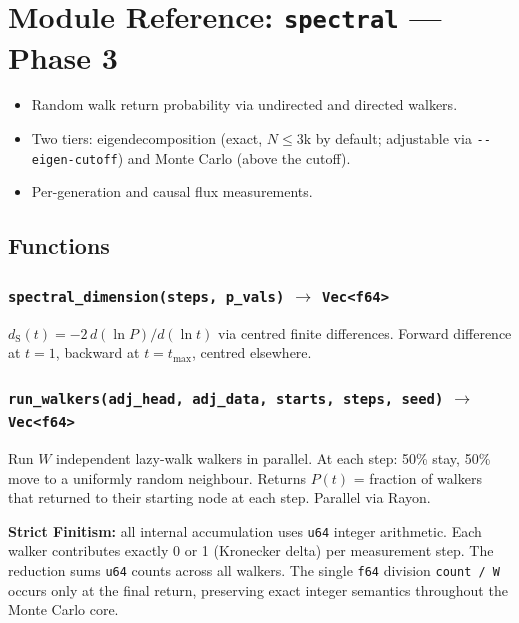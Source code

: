 \documentclass[11pt, a4paper, openany]{book}
\newcommand{\dS}{d_{\mathrm{S}}}
\newcommand{\code}[1]{\texttt{#1}}
\newcommand{\func}[1]{\texttt{\color{structure}#1}}
\newcommand{\modname}[1]{\texttt{\bfseries\color{main}#1}}
\newcounter{thm}[chapter]
\newenvironment{introduction}[1][Chapter Overview]{%
  \begin{tcolorbox}[
    enhanced,colback=structure!5,colframe=structure,
    colbacktitle=structure,coltitle=white,
    fonttitle=\small\bfseries,title={#1},
    arc=2pt,boxrule=0.7pt,
    left=8pt,right=8pt,top=6pt,bottom=6pt,
    before skip=12pt,after skip=12pt
  ]\itshape\begin{itemize}[leftmargin=*,itemsep=2pt,parsep=0pt]
}{%
  \end{itemize}\end{tcolorbox}
}
\begin{document}
\chapter{Module Reference: \modname{spectral} --- Phase 3}

\begin{introduction}[Spectral Dimension Measurement]
  \item Random walk return probability via undirected and directed walkers.
  \item Two tiers: eigendecomposition (exact, $N \le 3$k by default; adjustable via \code{-{}-eigen-cutoff}) and Monte Carlo (above the cutoff).
  \item Per-generation and causal flux measurements.
\end{introduction}

\section{Functions}

\subsection{\func{spectral\_dimension(steps, p\_vals)} $\to$ \code{Vec<f64>}}

$\dS(t) = -2\,d(\ln P)/d(\ln t)$ via centred finite differences.  Forward
difference at $t=1$, backward at $t=t_{\max}$, centred elsewhere.

\subsection{\func{run\_walkers(adj\_head, adj\_data, starts, steps, seed)} $\to$ \code{Vec<f64>}}

Run $W$ independent lazy-walk walkers in parallel.  At each step: 50\% stay,
50\% move to a uniformly random neighbour.  Returns $P(t)$ = fraction of
walkers that returned to their starting node at each step.  Parallel via Rayon.

\textbf{Strict Finitism:} all internal accumulation uses \code{u64} integer
arithmetic.  Each walker contributes exactly 0 or 1 (Kronecker delta) per
measurement step.  The reduction sums \code{u64} counts across all walkers.
The single \code{f64} division \code{count / W} occurs only at the final
return, preserving exact integer semantics throughout the Monte Carlo core.
\end{document}

